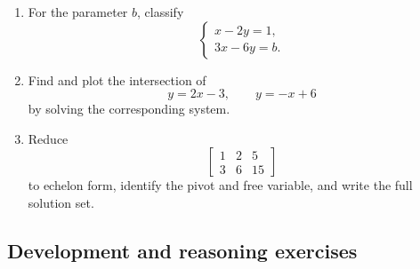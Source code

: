 \begin{enumerate}
\item For the parameter $b$, classify
\[
\begin{cases}
x-2y=1,\\
3x-6y=b.
\end{cases}
\]

\item Find and plot the intersection of
\[
y=2x-3,
\qquad
y=-x+6
\]
by solving the corresponding system.

\item Reduce
\[
\left[\begin{array}{cc|c}
1&2&5\\
3&6&15
\end{array}\right]
\]
to echelon form, identify the pivot and free variable, and write the full solution set.
\end{enumerate}

\subsection{Development and reasoning exercises}

